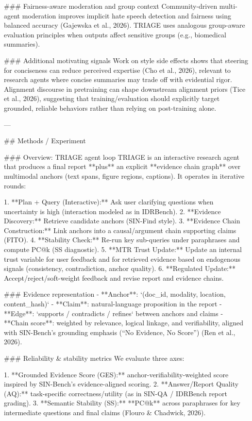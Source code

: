 ### Fairness-aware moderation and group context  
Community-driven multi-agent moderation improves implicit hate speech detection and fairness using balanced accuracy (Gajewska et al., 2026). TRIAGE uses analogous group-aware evaluation principles when outputs affect sensitive groups (e.g., biomedical summaries).

### Additional motivating signals  
Work on style side effects shows that steering for conciseness can reduce perceived expertise (Cho et al., 2026), relevant to research agents where concise summaries may trade off with evidential rigor. Alignment discourse in pretraining can shape downstream alignment priors (Tice et al., 2026), suggesting that training/evaluation should explicitly target grounded, reliable behaviors rather than relying on post-training alone.

---

## Methods / Experiment  

### Overview: TRIAGE agent loop  
TRIAGE is an interactive research agent that produces a final report **plus** an explicit **evidence chain graph** over multimodal anchors (text spans, figure regions, captions). It operates in iterative rounds:

1. **Plan + Query (Interactive):** Ask user clarifying questions when uncertainty is high (interaction modeled as in IDRBench).  
2. **Evidence Discovery:** Retrieve candidate anchors (SIN-Find style).  
3. **Evidence Chain Construction:** Link anchors into a causal/argument chain supporting claims (FITO).  
4. **Stability Check:** Re-run key sub-queries under paraphrases and compute PC@k (SS diagnostic).  
5. **MTR Trust Update:** Update an internal trust variable for user feedback and for retrieved evidence based on endogenous signals (consistency, contradiction, anchor quality).  
6. **Regulated Update:** Accept/reject/soft-weight feedback and revise report and evidence chains.

### Evidence representation  
- **Anchor**: `(doc_id, modality, location, content_hash)`  
- **Claim**: natural-language proposition in the report  
- **Edge**: `supports / contradicts / refines` between anchors and claims  
- **Chain score**: weighted by relevance, logical linkage, and verifiability, aligned with SIN-Bench’s grounding emphasis (“No Evidence, No Score”) (Ren et al., 2026).

### Reliability & stability metrics  
We evaluate three axes:

1. **Grounded Evidence Score (GES):** anchor-verifiability-weighted score inspired by SIN-Bench’s evidence-aligned scoring.  
2. **Answer/Report Quality (AQ):** task-specific correctness/utility (as in SIN-QA / IDRBench report grading).  
3. **Semantic Stability (SS):** **PC@k** across paraphrases for key intermediate questions and final claims (Flouro & Chadwick, 2026).

